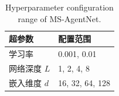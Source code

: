 \begin{table}
\TableStyle
\caption{Hyperparameter configuration range of MS-AgentNet.}
\label{tab:4-1}
\begin{tabularx}{\linewidth}{@{\extracolsep{\fill}}L{0.90}L{1.10}@{}}
\toprule
超参数 & 配置范围 \\
\midrule
学习率 & 0.001, 0.01 \\
网络深度 $L$ & 1, 2, 4, 8 \\
嵌入维度 $d$ & 16, 32, 64, 128 \\
\bottomrule
\end{tabularx}
\end{table}
